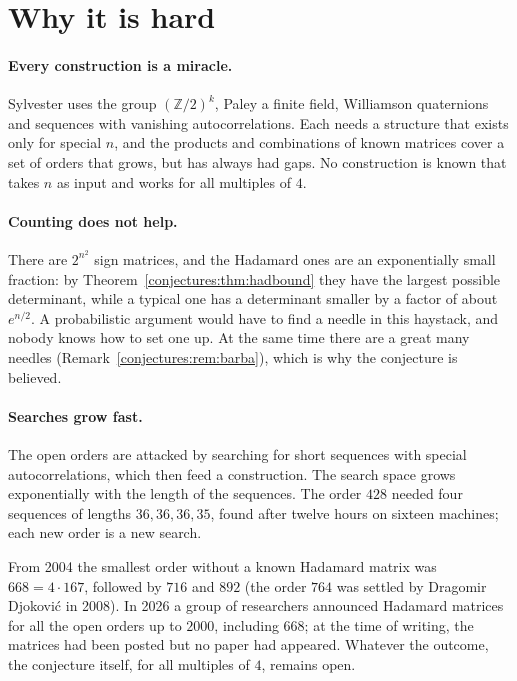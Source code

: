 \section{Why it is hard}

\paragraph{Every construction is a miracle.} Sylvester uses the group $(\mathbb Z/2)^k$, Paley a finite field, Williamson quaternions and sequences with
vanishing autocorrelations. Each needs a structure that exists only for special $n$, and the products and combinations of known matrices cover a set
of orders that grows, but has always had gaps. No construction is known that takes $n$ as input and works for all multiples of $4$.

\paragraph{Counting does not help.} There are $2^{n^2}$ sign matrices, and the Hadamard ones are an exponentially small fraction: by
Theorem~\ref{conjectures:thm:hadbound} they have the largest possible determinant, while a typical one has a determinant smaller by a factor of about $e^{n/2}$.
A probabilistic argument would have to find a needle in this haystack, and nobody knows how to set one up. At the same time there are a great many
needles (Remark~\ref{conjectures:rem:barba}), which is why the conjecture is believed.

\paragraph{Searches grow fast.} The open orders are attacked by searching for short sequences with special autocorrelations, which then feed a
construction. The search space grows exponentially with the length of the sequences. The order $428$ needed four sequences of lengths $36,36,36,35$,
found after twelve hours on sixteen machines; each new order is a new search.

\begin{remark}\label{conjectures:rem:668}
From 2004 the smallest order without a known Hadamard matrix was $668=4\cdot167$, followed by $716$ and $892$ (the order $764$ was settled by Dragomir
Djokovi\'c in 2008). In 2026 a group of researchers announced Hadamard matrices for all the open orders up to $2000$, including $668$; at the time of
writing, the matrices had been posted but no paper had appeared. Whatever the outcome, the conjecture itself, for all multiples of $4$, remains open.
\end{remark}

